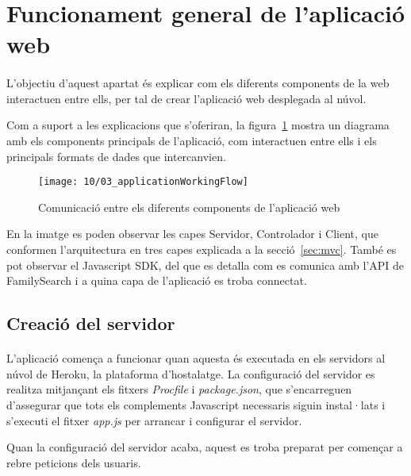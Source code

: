 \section{Funcionament general de l'aplicació web}

    \paragraph{}
    L'objectiu d'aquest apartat és explicar com els diferents components de la web interactuen entre ells, per tal de crear l'aplicació web desplegada al núvol.

    Com a suport a les explicacions que s'oferiran, la figura~\ref{img:appWorkflow} mostra un diagrama amb els components principals de l'aplicació, com interactuen entre ells i els principals formats de dades que intercanvien.

    \begin{figure}[p]
        \texttt{[image: 10/03\_applicationWorkingFlow]}
        \centering
        \caption{Comunicació entre els diferents components de l'aplicació web}\label{img:appWorkflow}
    \end{figure}

    En la imatge es poden observar les capes Servidor, Controlador i Client, que conformen l'arquitectura en tres capes explicada a la secció~\ref{sec:mvc}. També es pot observar el Javascript SDK, del que es detalla com es comunica amb l'API de FamilySearch i a quina capa de l'aplicació es troba connectat.


    \subsection{Creació del servidor}

    \paragraph{}
    L'aplicació comença a funcionar quan aquesta és executada en els servidors al núvol de Heroku, la plataforma d'hostalatge. La configuració del servidor es realitza mitjançant els fitxers \emph{Procfile} i \emph{package.json}, que s'encarreguen d'assegurar que tots els complements Javascript necessaris siguin instal·lats i s'executi el fitxer \emph{app.js} per arrancar i configurar el servidor.

    Quan la configuració del servidor acaba, aquest es troba preparat per començar a rebre peticions dels usuaris.


